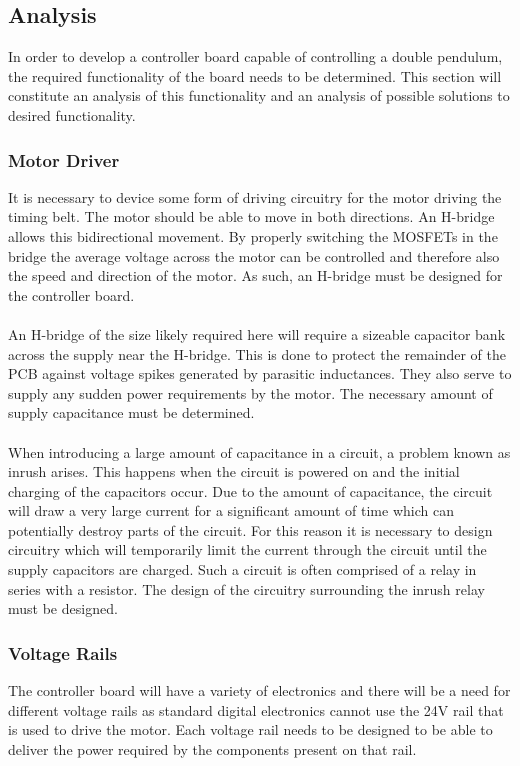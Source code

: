 \subsection{Analysis}
\label{sub:controller_board_analysis}

In order to develop a controller board capable of controlling a double pendulum, the required functionality of the board needs to be determined. 
This section will constitute an analysis of this functionality and an analysis of possible solutions to desired functionality.

\subsubsection{Motor Driver}
It is necessary to device some form of driving circuitry for the motor driving the timing belt.
The motor should be able to move in both directions. 
An H-bridge allows this bidirectional movement.
By properly switching the MOSFETs in the bridge the average voltage across the motor can be controlled and therefore also the speed and direction of the motor.
As such, an H-bridge must be designed for the controller board.
\\~\\
An H-bridge of the size likely required here will require a sizeable capacitor bank across the supply near the H-bridge.
This is done to protect the remainder of the PCB against voltage spikes generated by parasitic inductances. 
They also serve to supply any sudden power requirements by the motor.
The necessary amount of supply capacitance must be determined.
\\~\\
When introducing a large amount of capacitance in a circuit, a problem known as inrush arises.
This happens when the circuit is powered on and the initial charging of the capacitors occur.
Due to the amount of capacitance, the circuit will draw a very large current for a significant amount of time which can potentially destroy parts of the circuit.
For this reason it is necessary to design circuitry which will temporarily limit the current through the circuit until the supply capacitors are charged.
Such a circuit is often comprised of a relay in series with a resistor.
The design of the circuitry surrounding the inrush relay must be designed.

\subsubsection{Voltage Rails}
The controller board will have a variety of electronics and there will be a need for different voltage rails as standard digital electronics cannot use the 24V rail that is used to drive the motor.
Each voltage rail needs to be designed to be able to deliver the power required by the components present on that rail.

